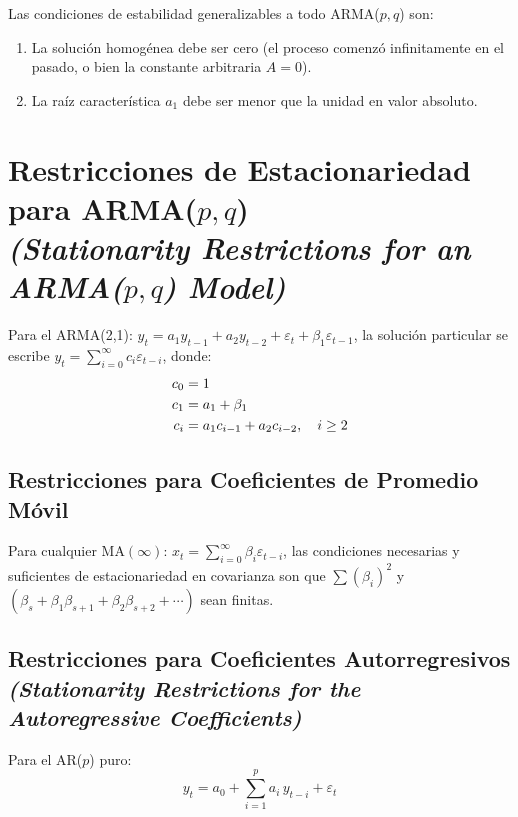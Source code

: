 \documentclass[12pt]{article}
\begin{document}
Las condiciones de estabilidad generalizables a todo ARMA($p,q$) son:
\begin{enumerate}
  \item La soluci\'on homog\'enea debe ser cero (el proceso comenz\'o infinitamente en el pasado, o bien la constante arbitraria $A = 0$).
  \item La ra\'iz caracter\'istica $a_1$ debe ser menor que la unidad en valor absoluto.
\end{enumerate}

\section{Restricciones de Estacionariedad para ARMA($p,q$)\\
\textit{(Stationarity Restrictions for an ARMA($p,q$) Model)}}

Para el ARMA(2,1): $y_t = a_1 y_{t-1} + a_2 y_{t-2} + \varepsilon_t + \beta_1\varepsilon_{t-1}$, la soluci\'on particular se escribe $y_t = \sum_{i=0}^{\infty} c_i\varepsilon_{t-i}$, donde:
\begin{align}
c_0 &= 1 \notag\\
c_1 &= a_1 + \beta_1 \notag\\
c_i &= a_1 c_{i-1} + a_2 c_{i-2}, \quad i \ge 2
\end{align}

\subsection{Restricciones para Coeficientes de Promedio M\'ovil}

Para cualquier MA$(\infty)$: $x_t = \sum_{i=0}^{\infty}\beta_i\varepsilon_{t-i}$, las condiciones necesarias y suficientes de estacionariedad en covarianza son que $\sum(\beta_i)^2$ y $(\beta_s + \beta_1\beta_{s+1} + \beta_2\beta_{s+2} + \cdots)$ sean finitas.

\subsection{Restricciones para Coeficientes Autorregresivos\\
\textit{(Stationarity Restrictions for the Autoregressive Coefficients)}}

Para el AR($p$) puro:
\begin{equation}
y_t = a_0 + \sum_{i=1}^{p} a_i\,y_{t-i} + \varepsilon_t
\end{equation}
\end{document}
